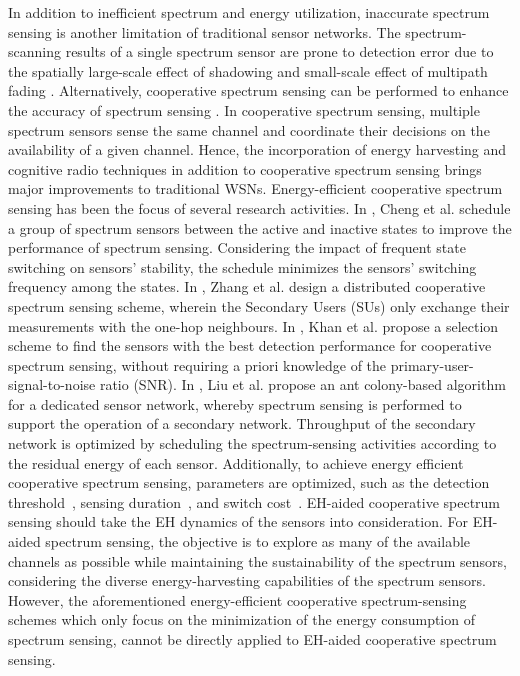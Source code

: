 \documentclass[journal]{IEEEtran} \ifCLASSINFOpdf
\begin{document}
In addition to inefficient spectrum and energy utilization, inaccurate spectrum sensing is another limitation of traditional sensor networks. The spectrum-scanning results of a single spectrum sensor are prone to detection error due to the spatially large-scale effect of shadowing and small-scale effect of multipath fading \cite{Akyildiz2011}.  Alternatively, cooperative spectrum sensing can be performed to enhance the accuracy of spectrum sensing \cite{Zhang2014a}. In cooperative spectrum sensing, multiple spectrum sensors sense the same channel and coordinate their decisions on the availability of a given channel. Hence, the incorporation of energy harvesting and cognitive radio techniques in addition to cooperative spectrum sensing brings major improvements to traditional WSNs. Energy-efficient cooperative spectrum sensing has been the focus of several research activities. In \cite{Cheng2012}, Cheng et al. schedule a group of spectrum sensors between the active and inactive states to improve the performance of spectrum sensing. Considering the impact of frequent state switching on sensors' stability, the schedule minimizes the sensors' switching frequency among the states. In \cite{Zhang2015}, Zhang et al. design a distributed cooperative spectrum sensing scheme, wherein the Secondary Users (SUs) only exchange their measurements with the one-hop neighbours. In \cite{Khan2010}, Khan et al. propose a selection scheme to find the sensors with the best detection performance for cooperative spectrum sensing, without requiring a priori knowledge of the primary-user-signal-to-noise ratio (SNR). In \cite{Liu2013a}, Liu et al. propose an ant colony-based algorithm for a dedicated sensor network, whereby spectrum sensing is performed to support the operation of a secondary network. Throughput of the secondary network is optimized by scheduling the spectrum-sensing activities according to the residual energy of each sensor. Additionally, to achieve energy efficient cooperative spectrum sensing, parameters are optimized, such as the detection threshold~\cite{Ebrahimzadeh2015}, sensing duration~\cite{Eryigit2013}, and switch cost~\cite{Bayhan2013}. EH-aided cooperative spectrum sensing should take the EH dynamics of the sensors into consideration. For EH-aided spectrum sensing, the objective is to explore as many of the available channels as possible while maintaining the sustainability of the spectrum sensors, considering the diverse energy-harvesting capabilities of the spectrum sensors. However, the aforementioned energy-efficient cooperative spectrum-sensing schemes which only focus on the minimization of the energy consumption of spectrum sensing, cannot be directly applied to EH-aided cooperative spectrum sensing.
\end{document}
